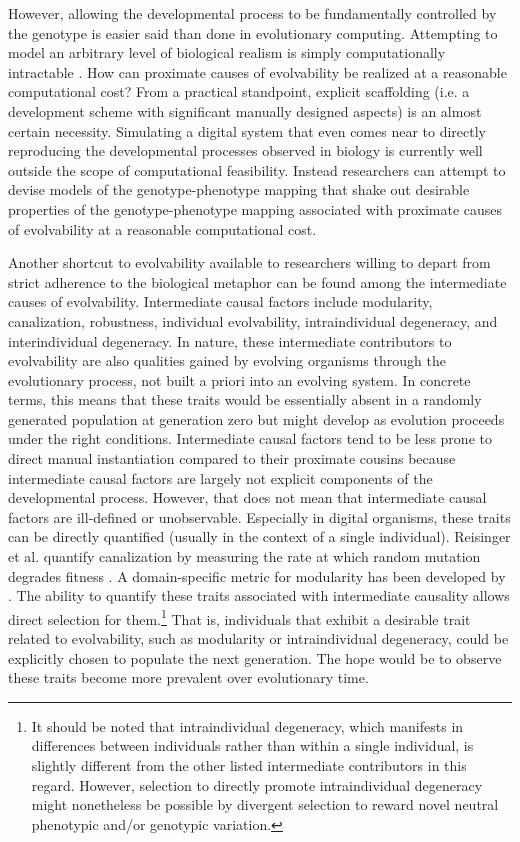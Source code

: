 However, allowing the developmental process to be fundamentally controlled by the genotype is easier said than done in evolutionary computing.
Attempting to model an arbitrary level of biological realism is simply computationally intractable  \cite[p 354]{Downing2015IntelligenceSystems}.
How can proximate causes of evolvability be realized at a reasonable computational cost?
From a practical standpoint, explicit scaffolding (i.e. a development scheme with significant manually designed aspects) is an almost certain necessity.
Simulating a digital system that even comes near to directly reproducing the developmental processes observed in biology is currently well outside the scope of computational feasibility.
Instead researchers can attempt to devise models of the genotype-phenotype mapping that shake out desirable properties of the genotype-phenotype mapping associated with proximate causes of evolvability at a reasonable computational cost.

Another shortcut to evolvability available to researchers willing to depart from strict adherence to the biological metaphor can be found among the intermediate causes of evolvability.
Intermediate causal factors include modularity, canalization, robustness, individual evolvability, intraindividual degeneracy, and interindividual degeneracy.
In nature, these intermediate contributors to evolvability are also qualities gained by evolving organisms through the evolutionary process, not built a priori into an evolving system.
In concrete terms, this means that these traits would be essentially absent in a randomly generated population at generation zero but might develop as evolution proceeds under the right conditions.
Intermediate causal factors tend to be less prone to direct manual instantiation compared to their proximate cousins because intermediate causal factors are largely not explicit components of the developmental process.
However, that does not mean that intermediate causal factors are ill-defined or unobservable. 
Especially in digital organisms, these traits can be directly quantified (usually in the context of a single individual).
Reisinger et al. quantify canalization by measuring the rate at which random mutation degrades fitness \cite{Reisinger2007AcquiringRepresentations}.
A domain-specific metric for modularity has been developed by \cite{Kashtan2005SpontaneousMotifs}.
The ability to quantify these traits associated with intermediate causality allows direct selection for them.\footnote
{It should be noted that intraindividual degeneracy, which manifests in differences between individuals rather than within a single individual, is slightly different from the other listed intermediate contributors in this regard.
However, selection to directly promote intraindividual degeneracy might nonetheless be possible by divergent selection to reward novel neutral phenotypic and/or genotypic variation.}
That is, individuals that exhibit a desirable trait related to evolvability, such as modularity or intraindividual degeneracy, could be explicitly chosen to populate the next generation. The hope would be to observe these traits become more prevalent over evolutionary time.

